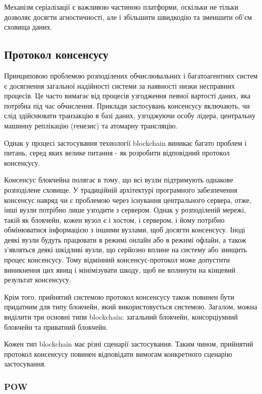 \documentclass{lib/styles/default-style}
\begin{document}
    
    Механізм серіалізації є важливою частиною платформи, оскільки не тільки дозволяє досягти агностичності, але і збільшити
    швидкодію та зменшити об’єм сховища даних.

\subsection{Протокол консенсусу}

    Принциповою проблемою розподілених обчислювальних і багатоагентних систем
    є досягнення загальної надійності системи за наявності низки несправних процесів.
    Це часто вимагає від процесів узгодження певної вартості даних, яка потрібна під час обчислення.
    Приклади застосувань консенсусу включають, чи слід здійснювати транзакцію в базі даних, узгоджуючи особу лідера,
    центральну машинну реплікацію (генезис) та атомарну трансляцію.
    
    Однак у процесі застосування технології blockchain виникає багато проблем і питань,
    серед яких велике питання - як розробити відповідний протокол консенсусу.

    Консенсус блокчейна полягає в тому, що всі вузли підтримують однакове розподілене сховище.
    У традиційній архітектурі програмного забезпечення консенсус навряд чи є проблемою через існування центрального сервера,
    отже, інші вузли потрібно лише узгодити з сервером. Однак у розподіленій мережі, такій як блокчейн, кожен вузол є і хостом,
    і сервером, і йому потрібно обмінюватися інформацією з іншими вузлами, щоб досягти консенсусу. Іноді деякі вузли будуть
    працювати в режимі онлайн або в режимі офлайн, а також з’являться деякі шкідливі вузли, що серйозно вплине на систему або знищить
    процес консенсусу. Тому відмінний консенсус-протокол може допустити виникнення цих явищ і мінімізувати шкоду,
    щоб не вплинути на кінцевий результат консенсусу.
    
    Крім того, прийнятий системою протокол консенсусу
    також повинен бути придатним для типу блокчейн, який використовується системою. Загалом, можна виділити три основні типи blockchain:
    загальний блокчейн, консорціумний блокчейн та приватний блокчейн.
    
    Кожен тип blockchain має різні сценарії застосування.
    Таким чином, прийнятий протокол консенсусу повинен відповідати вимогам конкретного сценарію застосування.

    \subsubsection{POW}
\end{document}
